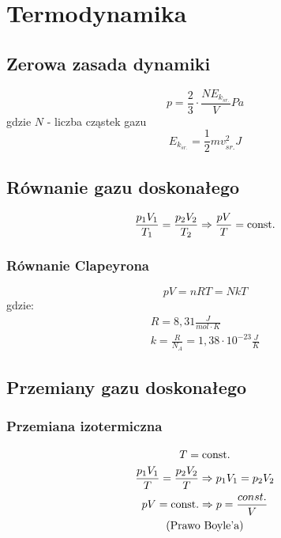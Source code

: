 \chapter{Termodynamika}
  \section{Zerowa zasada dynamiki}
    \begin{equation}
      p = \frac{2}{3}\cdot\frac{NE_{k_{\acute sr.}}}{V} \unit{Pa}
    \end{equation}
    gdzie $N$ - liczba cząstek gazu
    \begin{equation}
      E_{k_{\acute sr.}} = \frac{1}{2}mv_{\acute sr.}^2 \unit{J}
    \end{equation}
  \section{Równanie gazu doskonałego}
    \begin{equation}
      \frac{p_1V_1}{T_1} = \frac{p_2V_2}{T_2} \Rightarrow \frac{pV}{T} = \operatorname{const.}
    \end{equation}
    \subsection{Równanie Clapeyrona}
      \begin{equation}
        pV = nRT = NkT
      \end{equation}
      gdzie:
      \begin{gather}
        R =  8,31 \unit{\frac{J}{mol\cdot K}}\\
        k = \frac{R}{N_A} = 1,38\cdot 10^{-23} \unit{\frac{J}{K}}
      \end{gather}
  \section{Przemiany gazu doskonałego}
    \subsection{Przemiana izotermiczna}
      \begin{gather}
        T = \operatorname{const.}\\
        \frac{p_1V_1}{T} = \frac{p_2V_2}{T} \Rightarrow p_1V_1 = p_2V_2\\
        pV = \operatorname{const.} \Rightarrow p = \frac{const.}{V}\\
        \text{(Prawo Boyle'a)}
      \end{gather}
